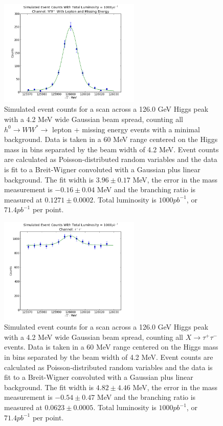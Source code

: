 \documentclass[a4paper]{article}
\begin{document}
\begin{figure}[H]
	\includegraphics[width=0.6\textwidth]{data-fit-ww-cut}
	\caption{Simulated event counts for a scan across a 126.0 GeV Higgs peak with a 4.2 MeV wide Gaussian beam spread, counting all $h^0\rightarrow WW^*\rightarrow$ lepton + missing energy events with a minimal background. Data is taken in a 60 MeV range centered on the Higgs mass in bins separated by the beam width of 4.2 MeV. Event counts are calculated as Poisson-distributed random variables and the data is fit to a Breit-Wigner convoluted with a Gaussian plus linear background. The fit width is $3.96\pm0.17$ MeV, the error in the mass measurement is $-0.16\pm0.04$ MeV and the branching ratio is measured at $0.1271\pm0.0002$. Total luminosity is $1000pb^{-1}$, or $71.4pb^{-1}$ per point.}
\label{data-fit-ww-cut}
\end{figure}

\begin{figure}[H]
	\includegraphics[width=0.6\textwidth]{data-fit-tt-raw}
	\caption{Simulated event counts for a scan across a 126.0 GeV Higgs peak with a 4.2 MeV wide Gaussian beam spread, counting all $X\rightarrow \tau^+\tau^-$ events. Data is taken in a 60 MeV range centered on the Higgs mass in bins separated by the beam width of 4.2 MeV. Event counts are calculated as Poisson-distributed random variables and the data is fit to a Breit-Wigner convoluted with a Gaussian plus linear background. The fit width is $4.82\pm4.46$ MeV, the error in the mass measurement is $-0.54\pm0.47$ MeV and the branching ratio is measured at $0.0623\pm0.0005$. Total luminosity is $1000pb^{-1}$, or $71.4pb^{-1}$ per point.}
\label{data-fit-tt-raw}
\end{figure}
\end{document}
